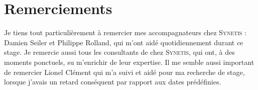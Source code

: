 \section*{Remerciements}

Je tiens tout particulièrement à remercier mes accompagnateurs chez \textsc{Synetis} : Damien Seiler et Philippe Rolland, qui m'ont aidé quotidiennement durant ce stage. Je remercie aussi tous les consultants de chez \textsc{Synetis}, qui ont, à des moments ponctuels, su m'enrichir de leur expertise. Il me semble aussi important de remercier Lionel Clément qui m'a suivi et aidé pour ma recherche de stage, lorsque j'avais un retard conséquent par rapport aux dates prédéfinies.